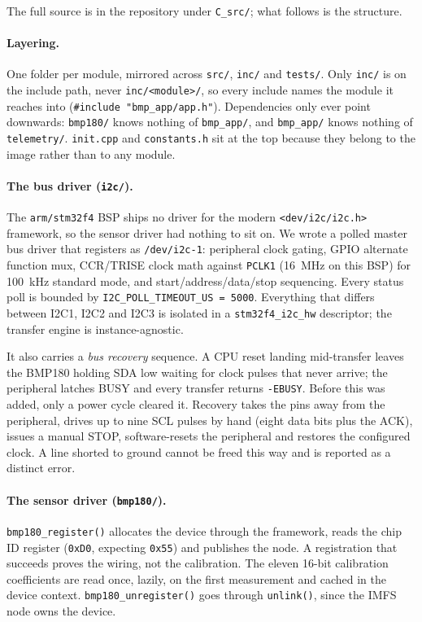 \documentclass[10pt,a4]{article}
\begin{document}
The full source is in the repository under \texttt{C\_src/}; what follows is the
structure.

\paragraph{Layering.} One folder per module, mirrored across \texttt{src/},
\texttt{inc/} and \texttt{tests/}. Only \texttt{inc/} is on the include path,
never \texttt{inc/<module>/}, so every include names the module it reaches into
(\texttt{\#include "bmp\_app/app.h"}). Dependencies only ever point downwards:
\texttt{bmp180/} knows nothing of \texttt{bmp\_app/}, and \texttt{bmp\_app/}
knows nothing of \texttt{telemetry/}. \texttt{init.cpp} and
\texttt{constants.h} sit at the top because they belong to the image rather
than to any module.

\paragraph{The bus driver (\texttt{i2c/}).} The \texttt{arm/stm32f4} BSP ships
no driver for the modern \texttt{<dev/i2c/i2c.h>} framework, so the sensor
driver had nothing to sit on. We wrote a polled master bus driver that
registers as \texttt{/dev/i2c-1}: peripheral clock gating, GPIO alternate
function mux, CCR/TRISE clock math against \texttt{PCLK1} (16~MHz on this BSP)
for 100~kHz standard mode, and start/address/data/stop sequencing. Every status
poll is bounded by \texttt{I2C\_POLL\_TIMEOUT\_US = 5000}. Everything that
differs between I2C1, I2C2 and I2C3 is isolated in a \texttt{stm32f4\_i2c\_hw}
descriptor; the transfer engine is instance-agnostic.

It also carries a \emph{bus recovery} sequence. A CPU reset landing mid-transfer
leaves the BMP180 holding SDA low waiting for clock pulses that never arrive;
the peripheral latches BUSY and every transfer returns \texttt{-EBUSY}. Before
this was added, only a power cycle cleared it. Recovery takes the pins away from
the peripheral, drives up to nine SCL pulses by hand (eight data bits plus the
ACK), issues a manual STOP, software-resets the peripheral and restores the
configured clock. A line shorted to ground cannot be freed this way
and is reported as a distinct error.

\paragraph{The sensor driver (\texttt{bmp180/}).} \texttt{bmp180\_register()}
allocates the device through the framework, reads the chip ID register
(\texttt{0xD0}, expecting \texttt{0x55}) and publishes the node. A registration that succeeds proves the wiring,
not the calibration. The eleven 16-bit calibration coefficients are read once,
lazily, on the first measurement and cached in the device context.
\texttt{bmp180\_unregister()} goes through \texttt{unlink()}, since the IMFS node
owns the device.
\end{document}
